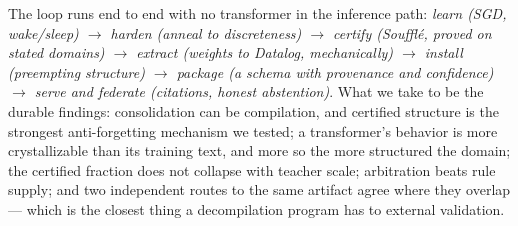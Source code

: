 \documentclass[sigconf,nonacm]{acmart}
\begin{document}
The loop runs end to end with no transformer in the inference path: \emph{learn (SGD, wake/sleep)
$\to$ harden (anneal to discreteness) $\to$ certify (Souffl\'e, proved on stated domains) $\to$
extract (weights to Datalog, mechanically) $\to$ install (preempting structure) $\to$ package
(a schema with provenance and confidence) $\to$ serve and federate (citations, honest abstention)}.
What we take to be the durable findings: consolidation can be compilation, and certified structure
is the strongest anti-forgetting mechanism we tested; a transformer's behavior is more
crystallizable than its training text, and more so the more structured the domain; the certified
fraction does not collapse with teacher scale; arbitration beats rule supply; and two independent
routes to the same artifact agree where they overlap --- which is the closest thing a
decompilation program has to external validation.



\end{document}
